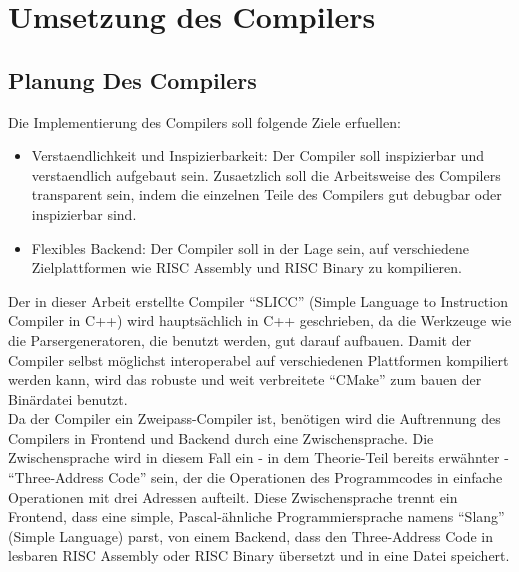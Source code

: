 \part{Umsetzung des Compilers}
\chapter{Planung Des Compilers}

Die Implementierung des Compilers soll folgende Ziele erfuellen:

\begin{itemize}
\item Verstaendlichkeit und Inspizierbarkeit: Der Compiler soll inspizierbar und verstaendlich aufgebaut sein. Zusaetzlich soll die Arbeitsweise des Compilers transparent sein, indem die einzelnen Teile des Compilers gut debugbar oder inspizierbar sind.
\item Flexibles Backend: Der Compiler soll in der Lage sein, auf verschiedene Zielplattformen wie RISC Assembly und RISC Binary zu kompilieren.
\end{itemize}

Der in dieser Arbeit erstellte Compiler ``SLICC'' (Simple Language to Instruction Compiler in C++)  wird hauptsächlich in C++ geschrieben, da die Werkzeuge wie die Parsergeneratoren, die benutzt werden, gut darauf aufbauen.
Damit der Compiler selbst möglichst interoperabel auf verschiedenen Plattformen kompiliert werden kann, wird das robuste und weit verbreitete ``CMake'' zum bauen der Binärdatei benutzt.\\
Da der Compiler ein Zweipass-Compiler ist, benötigen wird die Auftrennung des Compilers in Frontend und Backend durch eine Zwischensprache.
Die Zwischensprache wird in diesem Fall ein - in dem Theorie-Teil bereits erwähnter - ``Three-Address Code'' sein, der die Operationen des Programmcodes in einfache Operationen mit drei Adressen aufteilt.
Diese Zwischensprache trennt ein Frontend, dass eine simple, Pascal-ähnliche Programmiersprache namens ``Slang'' (Simple Language) parst, von einem Backend, dass den Three-Address Code in lesbaren RISC Assembly oder RISC Binary übersetzt und in eine Datei speichert.\\


